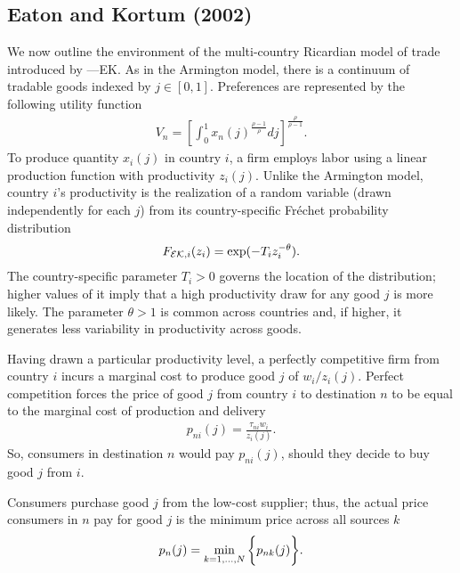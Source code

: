 \documentclass[12pt,dvips, ps2pdf]{article}
\begin{document}
\subsection{Eaton and Kortum (2002)}

We now outline the environment of the multi-country Ricardian model of trade introduced by \citet{ek02}---EK. As in the Armington model, there is a continuum of tradable goods indexed by $j\in[0,1]$. Preferences are represented by the following utility function
\begin{eqnarray*}
V_n = \left [\int_{0}^{1} x_n(j)^{\frac{\rho-1}{\rho}}dj\right ]^\frac{\rho}{\rho-1}.
\end{eqnarray*}
To produce quantity $x_i(j)$ in country $i$, a firm employs labor using a linear production function with productivity $z_i(j)$. Unlike the Armington model, country $i$'s productivity is the realization of a random variable (drawn independently for each $j$) from its country-specific Fr\'{e}chet probability distribution
\begin{eqnarray}
F_{\mathcal{EK},i}(z_i)=\exp(-T_iz_i^{-\theta}).\notag
\end{eqnarray}
The country-specific parameter $T_i>0$ governs the location of the distribution; higher values of it imply that a high productivity draw for any good $j$ is more likely. The parameter $\theta>1$ is common across countries and, if higher, it generates less variability in productivity across goods.

Having drawn a particular productivity level, a perfectly competitive firm from country $i$ incurs a marginal cost to produce good $j$ of $w_i/z_i(j)$. Perfect competition forces the price of good $j$ from country $i$ to destination $n$ to be equal to the marginal cost of production and delivery
\begin{eqnarray*}
p_{ni}(j)=\frac{\tau_{ni}w_i}{z_i(j)}.
\end{eqnarray*}
So, consumers in destination $n$ would pay $p_{ni}(j)$, should they decide to buy good $j$ from $i$.

Consumers purchase good $j$ from the low-cost supplier; thus, the actual price consumers in $n$ pay for good $j$ is the minimum price across all sources $k$
\begin{eqnarray}
p_n(j)= \min_{k=1,...,N}\bigg\{p_{nk}(j)\bigg\}.\notag
\end{eqnarray}
\end{document}
